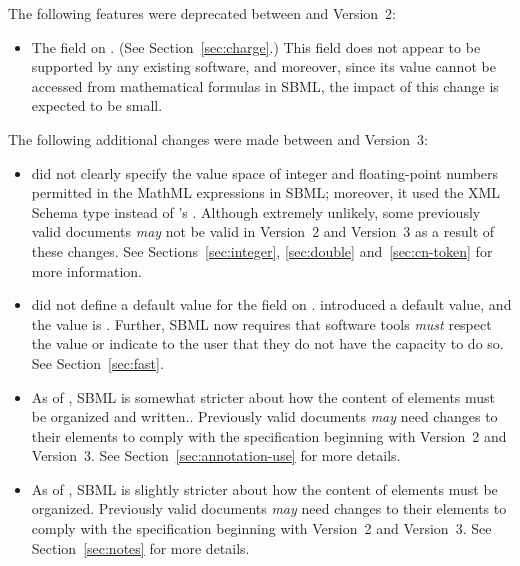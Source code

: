 \begin{blockChanged}
\begin{itemize}
\end{itemize}

The following features were deprecated between \sbmltwoone and
Version~2:
\begin{itemize}
  
\item The  field on \Species.  (See
  Section~\ref{sec:charge}.)  This field does not appear to be
  supported by any existing software, and moreover, since its
  value cannot be accessed from mathematical formulas in SBML, the
  impact of this change is expected to be small.

\end{itemize}

The following additional changes were made between \sbmltwoone and
Version~3:
\begin{itemize}

\item \sbmltwoone did not clearly specify the value space of
  integer and floating-point numbers permitted in the MathML
  expressions in SBML; moreover, it used the XML Schema type
   instead of \sbmltwotwo's .  Although
  extremely unlikely, some previously valid \sbmltwoone documents
  \emph{may} not be valid in Version~2 and Version~3 as a result
  of these changes.  See Sections~\ref{sec:integer},
  \ref{sec:double} and~\ref{sec:cn-token} for more information.

\item \sbmltwoone did not define a default value for the field
   on \Reaction.  \sbmltwotwo introduced a default
  value, and the value is .  Further, SBML now requires
  that software tools \emph{must} respect the value or indicate to
  the user that they do not have the capacity to do so.  See
  Section~\ref{sec:fast}.
  
\item As of \sbmltwotwo, SBML is somewhat stricter about how the
  content of  elements must be organized and
  written..  Previously valid \sbmltwoone documents \emph{may}
  need changes to their  elements to comply with
  the specification beginning with Version~2 and Version~3.  See
  Section~\ref{sec:annotation-use} for more details.
  
\item As of \sbmltwotwo, SBML is slightly stricter about how the
  content of  elements must be organized.  Previously
  valid \sbmltwoone documents \emph{may} need changes to their
   elements to comply with the specification
  beginning with Version~2 and Version~3.  See
  Section~\ref{sec:notes} for more details.
  

\end{itemize}
\end{blockChanged}
